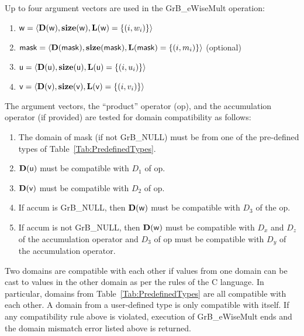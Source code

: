 Up to four argument vectors are used in the {\sf GrB\_eWiseMult} operation:
\begin{enumerate}
	\item ${\sf w} = \langle \bold{D}({\sf w}),\bold{size}({\sf w}),\bold{L}({\sf w}) = \{(i,w_i) \} \rangle$
	\item ${\sf mask} = \langle \bold{D}({\sf mask}),\bold{size}({\sf mask}),\bold{L}({\sf mask}) = \{(i,m_i) \} \rangle$ (optional)
	\item ${\sf u} = \langle \bold{D}({\sf u}),\bold{size}({\sf u}),\bold{L}({\sf u}) = \{(i,u_i) \} \rangle$
	\item ${\sf v} = \langle \bold{D}({\sf v}),\bold{size}({\sf v}),\bold{L}({\sf v}) = \{(i,v_i) \} \rangle$
\end{enumerate}

The argument vectors, the ``product'' operator ({\sf op}), and the accumulation 
operator (if provided) are tested for domain compatibility as follows:
\begin{enumerate}
	\item The domain of {\sf mask} (if not {\sf GrB\_NULL}) must be from one of the pre-defined types of Table~\ref{Tab:PredefinedTypes}.

	\item $\bold{D}({\sf u})$ must be compatible with $D_1$ of {\sf op}.

	\item $\bold{D}({\sf v})$ must be compatible with $D_2$ of {\sf op}.

	\item If {\sf accum} is {\sf GrB\_NULL}, then $\bold{D}({\sf w})$ must be 
    compatible with $D_3$ of the {\sf op}.

	\item If {\sf accum} is not {\sf GrB\_NULL}, then $\bold{D}({\sf w})$ must be
    compatible with $D_x$ and $D_z$ of the accumulation operator and $D_3$ of
    {\sf op} must be compatible with $D_y$ of the accumulation operator.
\end{enumerate}
Two domains are compatible with each other if values from one domain can be cast 
to values in the other domain as per the rules of the C language.
In particular, domains from Table~\ref{Tab:PredefinedTypes} are all compatible 
with each other. A domain from a user-defined type is only compatible with itself.
If any compatibility rule above is violated, execution of {\sf GrB\_eWiseMult} ends
and the domain mismatch error listed above is returned.

